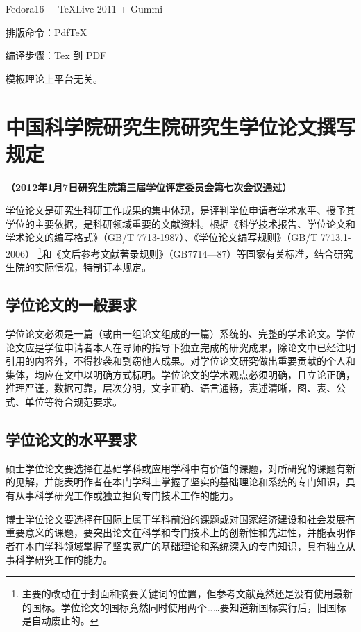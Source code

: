 \documentclass[a4paper,12pt,oneside,openany]{book}
\begin{document}
\begin{CJK}{UTF8}{hei}
Fedora16 + \TeX Live 2011 +  Gummi

排版命令：PdfTeX

编译步骤：Tex 到 PDF

模板理论上平台无关。


\chapter{中国科学院研究生院研究生学位论文撰写规定 }

\begin{center}
\textbf{（2012年1月7日研究生院第三届学位评定委员会第七次会议通过）}
\par\end{center}

学位论文是研究生科研工作成果的集中体现，是评判学位申请者学术水平、授予其学位的主要依据，是科研领域重要的文献资料。根据《科学技术报告、学位论文和学术论文的编写格式》（GB/T
7713-1987）、《学位论文编写规则》（GB/T 7713.1-2006）\textbf{}%
\footnote{主要的改动在于封面和摘要关键词的位置，但参考文献竟然还是没有使用最新的国标。学位论文的国标竟然同时使用两个……要知道新国标实行后，旧国标是自动废止的。%
}和《文后参考文献著录规则》（GB7714—87）等国家有关标准，结合研究生院的实际情况，特制订本规定。


\section{学位论文的一般要求}

学位论文必须是一篇（或由一组论文组成的一篇）系统的、完整的学术论文。学位论文应是学位申请者本人在导师的指导下独立完成的研究成果，除论文中已经注明引用的内容外，不得抄袭和剽窃他人成果。对学位论文研究做出重要贡献的个人和集体，均应在文中以明确方式标明。学位论文的学术观点必须明确，且立论正确，推理严谨，数据可靠，层次分明，文字正确、语言通畅，表述清晰，图、表、公式、单位等符合规范要求。


\section{学位论文的水平要求}

硕士学位论文要选择在基础学科或应用学科中有价值的课题，对所研究的课题有新的见解，并能表明作者在本门学科上掌握了坚实的基础理论和系统的专门知识，具有从事科学研究工作或独立担负专门技术工作的能力。

博士学位论文要选择在国际上属于学科前沿的课题或对国家经济建设和社会发展有重要意义的课题，要突出论文在科学和专门技术上的创新性和先进性，并能表明作者在本门学科领域掌握了坚实宽广的基础理论和系统深入的专门知识，具有独立从事科学研究工作的能力。



\end{CJK}
\end{document}
